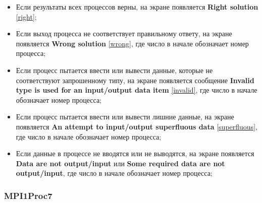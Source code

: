 \begin{itemize} 
    \item Если результаты всех процессов верны, на экране появляется \textbf{Right solution} \ref{right};
    \item Если выход процесса не соответствует правильному ответу, на экране появляется \textbf{Wrong solution} \ref{wrong}, где число в начале обозначает номер процесса;
    \item Если процесс пытается ввести или вывести данные, которые не соответствуют запрошенному типу, на экране появляется сообщение \textbf{Invalid type is used for an input/output data item} \ref{invalid}, где число в начале обозначает номер процесса;
    \item Если процесс пытается ввести или вывести лишние данные, на экране появляется \textbf{An attempt to input/output superfluous data} \ref{superfluous}, где число в начале обозначает номер процесса;
    \item Если данные в процессе не вводятся или не выводятся, на экране появляется \textbf{Data are not output/input} или \textbf{Some required data are not output/input}, где число в начале обозначает номер процесса;
\end{itemize}

\subsubsection{MPI1Proc7}

